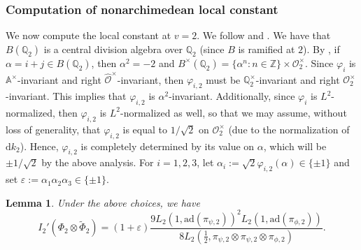 \documentclass[11pt]{amsart}
\newtheorem{lemma}[theorem]{Lemma}
\theoremstyle{definition}
\begin{document}
\subsubsection{Computation of nonarchimedean local constant}

We now compute the local constant at $v=2$. We follow \cite[Prop. 4.5]{WoodburyLocalConst} and \cite[Thm. 2]{WatsonPhD}. We have that $B(\mathbb{Q}_2)$ is a central division algebra over $\mathbb{Q}_2$ (since $B$ is ramified at $2$). By \cite[Thm.~13.1.6, Lemma 13.3.2]{Voight}, if $\alpha=i+j \in B(\mathbb{Q}_2)$, then $\alpha^2=-2$ and $B^{\times}(\mathbb{Q}_{2}) = \{ \alpha^n : n\in \mathbb{Z} \} \times \mathcal{O}_{2}^{\times}$. Since $\varphi_{i}$ is $\mathbb{A}^{\times}$-invariant and right $\widehat{\mathcal{O}}^{\times}$-invariant, then $\varphi_{i,2}$ must be $\mathbb{Q}_{2}^{\times}$-invariant and right $\mathcal{O}_{2}^{\times}$-invariant. This implies that $\varphi_{i,2}$ is $\alpha^2$-invariant. Additionally, since $\varphi_{i}$ is $L^2$-normalized, then $\varphi_{i,2}$ is $L^2$-normalized as well, so that we may assume, without loss of generality, that $\varphi_{i,2}$ is equal to $1/\sqrt{2}$ on $\mathcal{O}_{2}^{\times}$ (due to the normalization of $\mathrm{d}k_2$). Hence, $\varphi_{i,2}$ is completely determined by its value on $\alpha$, which will be $\pm 1/\sqrt{2}$ by the above analysis. For $i=1,2,3$, let $\alpha_{i} := \sqrt{2} \varphi_{i,2}(\alpha)\in \{\pm 1\}$ and set $\varepsilon := \alpha_1 \alpha_2 \alpha_3 \in \{\pm 1\}$.

\begin{lemma}\label{LocalConst2}
Under the above choices, we have
$$ I_{2}'(\Phi_2 \otimes \widetilde{\Phi}_2) = (1+\varepsilon)\frac{9L_2(1,\mathrm{ad}(\pi_{\psi,2}))^2 L_2(1,\mathrm{ad}(\pi_{\phi,2}))}{8 L_2(\frac{1}{2}, \pi_{\psi,2} \otimes \pi_{\psi,2}\otimes \pi_{\phi,2})}. $$
\end{lemma}
\end{document}
